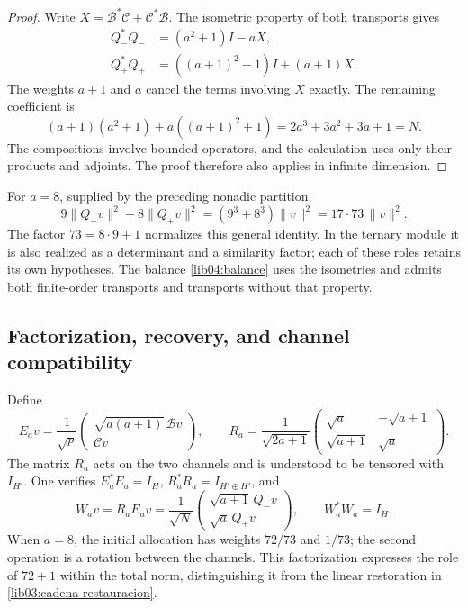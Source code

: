 \begin{proof}
Write \(X=\mathcal B^*\mathcal C+\mathcal C^*\mathcal B\).
The isometric property of both transports gives
\begin{align*}
 Q_-^*Q_-&=(a^2+1)I-aX,\\
 Q_+^*Q_+&=((a+1)^2+1)I+(a+1)X.
\end{align*}
The weights \(a+1\) and \(a\) cancel the terms involving
\(X\) exactly. The remaining coefficient is
\[
 (a+1)(a^2+1)+a((a+1)^2+1)
 =2a^3+3a^2+3a+1=N.
\]
The compositions involve bounded operators, and the calculation uses
only their products and adjoints. The proof therefore also applies
in infinite dimension.
\end{proof}

For \(a=8\), supplied by the preceding nonadic partition,
\begin{equation}
 9\|Q_-v\|^2+8\|Q_+v\|^2
 =(9^3+8^3)\|v\|^2=17\cdot73\,\|v\|^2.
 \label{lib04:balance-canonico}
\end{equation}
The factor \(73=8\cdot9+1\) normalizes this general identity. In the
ternary module it is also realized as a determinant and a similarity
factor; each of these roles retains its own hypotheses.
The balance \eqref{lib04:balance} uses the isometries and admits both
finite-order transports and transports without that property.

\subsection{Factorization, recovery, and channel compatibility}
\label{lib04:factorizacion}

Define
\begin{equation}
 E_av=\frac1{\sqrt p}
 \begin{pmatrix}\sqrt{a(a+1)}\,\mathcal Bv\\\mathcal Cv\end{pmatrix},
 \qquad
 R_a=\frac1{\sqrt{2a+1}}
 \begin{pmatrix}\sqrt a&-\sqrt{a+1}\\
                 \sqrt{a+1}&\sqrt a\end{pmatrix}.
 \label{lib04:factorizacion-er}
\end{equation}
The matrix \(R_a\) acts on the two channels and is understood to be
tensored with \(I_{H'}\). One verifies
\(E_a^*E_a=I_H\), \(R_a^*R_a=I_{H'\oplus H'}\), and
\begin{equation}
 W_av=R_aE_av
 =\frac1{\sqrt N}
 \begin{pmatrix}\sqrt{a+1}\,Q_-v\\\sqrt a\,Q_+v\end{pmatrix},
 \qquad W_a^*W_a=I_H.
 \label{lib04:w}
\end{equation}
When \(a=8\), the initial allocation has weights \(72/73\) and
\(1/73\); the second operation is a rotation between the channels.
This factorization expresses the role of \(72+1\) within the total
norm, distinguishing it from the linear restoration in
\eqref{lib03:cadena-restauracion}.

